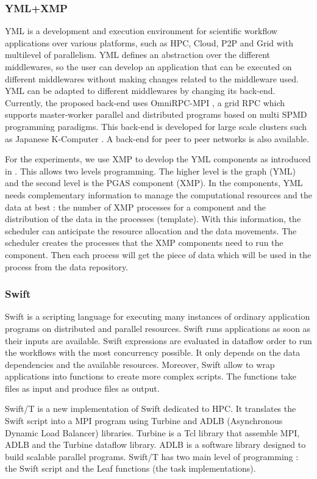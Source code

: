 \subsubsection{YML+XMP}
YML \cite{DelEP2006} is a development and execution environment for scientific workflow applications over various platforms, such as HPC, Cloud, P2P and Grid with multilevel of parallelism.
YML defines an abstraction over the different middlewares, so the user can develop an application that can be executed on different middlewares without making changes related to the middleware used.
YML can be adapted to different middlewares by changing its back-end.
Currently, the proposed back-end \cite{TsSHP2013} uses OmniRPC-MPI \cite{SaHTS2001}, a grid RPC which supports master-worker parallel and distributed programs based on multi SPMD programming paradigms.
This back-end is developed for large scale clusters such as Japanese K-Computer \cite{TsSHP2013}.
A back-end for peer to peer networks is also available.

For the experiments, we use XMP to develop the YML components as introduced in \cite{TsSHP2013}.
This allows two levels programming.
The higher level is the graph (YML) and the second level is the PGAS component (XMP).
In the components, YML needs complementary information to manage the computational resources and the data at best : the number of XMP processes for a component and the distribution of the data in the processes (template).
With this information, the scheduler can anticipate the resource allocation and the data movements.
The scheduler creates the processes that the XMP components need to run the component.
Then each process will get the piece of data which will be used in the process from the data repository.

\subsubsection{Swift}
Swift \cite{ZHCFL2007} \cite{WHWCK2011} is a scripting language for executing many instances of ordinary application programs on distributed and parallel resources.
Swift runs applications as soon as their inputs are available.
Swift expressions are evaluated in dataflow order to run the workflows with the most concurrency possible.
It only depends on the data dependencies and the available resources.
Moreover, Swift allow to wrap applications into functions to create more complex scripts.
The functions take files as input and produce files as output.

Swift/T \cite{WAWKL2013} is a new implementation of Swift dedicated to HPC.
It translates the Swift script into a MPI program using Turbine \cite{WAMLK2012} and ADLB (Asynchronous Dynamic Load Balancer) \cite{LusPB2010} libraries.
Turbine is a Tcl library that assemble MPI, ADLB and the Turbine dataflow library.
ADLB is a software library designed to build scalable parallel programs.
Swift/T has two main level of programming : the Swift script and the Leaf functions (the task implementations).

